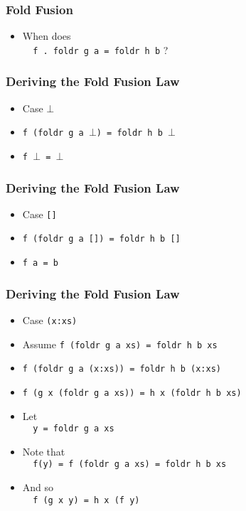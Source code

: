 \documentclass{beamer}
\begin{document}
\begin{frame}[fragile]
    \frametitle{Fold Fusion}

    \begin{itemize}
        \item When does \\
        \verb?  f . foldr g a = foldr h b? ?
    \end{itemize}
\end{frame}

\begin{frame}[fragile]
    \frametitle{Deriving the Fold Fusion Law}

\begin{itemize}
    \item<1-> Case $\bot$    
    \item<2-> \verb?f (foldr g a ?$\bot$\verb?) = foldr h b ?$\bot$    
    \item<3-> \verb?f ?$\bot$\verb? = ?$\bot$
\end{itemize}

\end{frame}

\begin{frame}[fragile]
    \frametitle{Deriving the Fold Fusion Law}

\begin{itemize}
    \item<1-> Case \verb?[]?    
    \item<2-> \verb?f (foldr g a []) = foldr h b []?
    \item<3-> \verb?f a = b?
\end{itemize}

\end{frame}

\begin{frame}[fragile]
    \frametitle{Deriving the Fold Fusion Law}

\begin{itemize}
    \item<1-> Case \verb?(x:xs)? 
    \item<2-> Assume \verb?f (foldr g a xs) = foldr h b xs?
    \item<3-> \verb?f (foldr g a (x:xs)) = foldr h b (x:xs)?
    \item<4-> \verb?f (g x (foldr g a xs)) = h x (foldr h b xs)?
    \item<5-> Let \\
    \verb?  y = foldr g a xs?
    \item<6-> Note that  \\
    \verb?  f(y) = f (foldr g a xs) = foldr h b xs?
    \item<7-> And so \\
    \verb?  f (g x y) = h x (f y)?
\end{itemize}

\end{frame}
\end{document}
